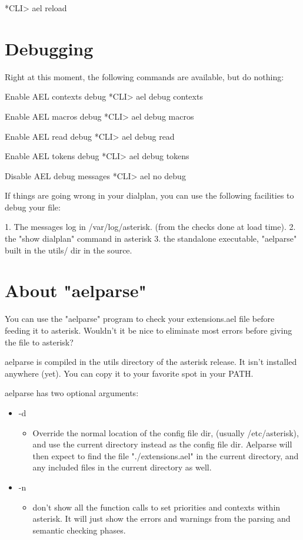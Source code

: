     *CLI> ael reload


\section{Debugging}

Right at this moment, the following commands are available, but do
nothing:

Enable AEL contexts debug
   *CLI> ael debug contexts 

Enable AEL macros debug
   *CLI> ael debug macros 

Enable AEL read debug
   *CLI> ael debug read

Enable AEL tokens debug
   *CLI> ael debug tokens 

Disable AEL debug messages
   *CLI> ael no debug

If things are going wrong in your dialplan, you can use the following
facilities to debug your file:

1. The messages log in /var/log/asterisk. (from the checks done at load time).
2. the "show dialplan" command in asterisk
3. the standalone executable, "aelparse" built in the utils/ dir in the source.


\section{About "aelparse"}

You can use the "aelparse" program to check your extensions.ael
file before feeding it to asterisk. Wouldn't it be nice to eliminate
most errors before giving the file to asterisk?

aelparse is compiled in the utils directory of the asterisk release.
It isn't installed anywhere (yet). You can copy it to your favorite
spot in your PATH.

aelparse has two optional arguments:

\begin{itemize}
  \item -d
  \begin{itemize}
    \item Override the normal location of the config file dir, (usually
       /etc/asterisk), and use the current directory instead as the
       config file dir. Aelparse will then expect to find the file
       "./extensions.ael" in the current directory, and any included
       files in the current directory as well.
  \end{itemize}
  \item -n
  \begin{itemize}
    \item don't show all the function calls to set priorities and contexts
       within asterisk. It will just show the errors and warnings from
       the parsing and semantic checking phases.
  \end{itemize}
\end{itemize}

